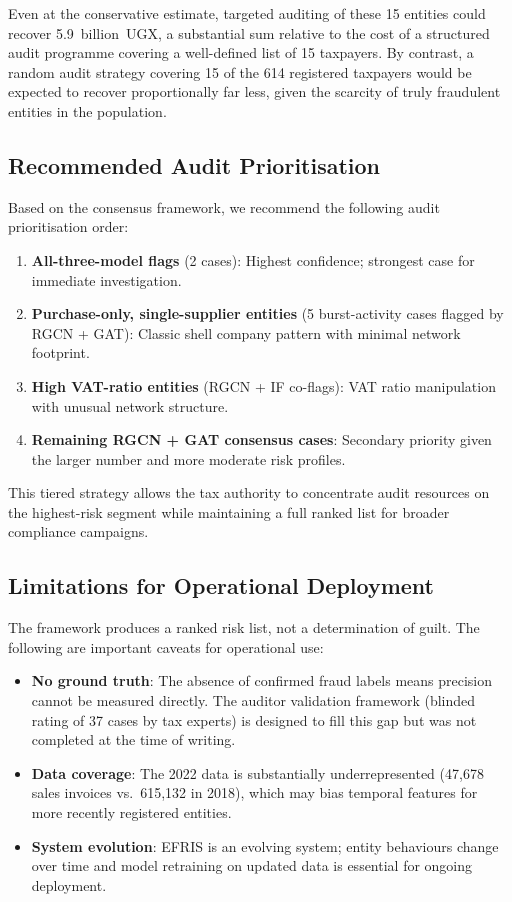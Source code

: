 \documentclass[10pt,twocolumn]{article}
\begin{document}
Even at the conservative estimate, targeted auditing of these 15 entities
could recover 5.9~billion~UGX, a substantial sum relative to the cost of
a structured audit programme covering a well-defined list of 15 taxpayers.
By contrast, a random audit strategy covering 15 of the 614 registered
taxpayers would be expected to recover proportionally far less, given the
scarcity of truly fraudulent entities in the population.

\subsection{Recommended Audit Prioritisation}

Based on the consensus framework, we recommend the following audit
prioritisation order:

\begin{enumerate}
  \item \textbf{All-three-model flags} (2 cases): Highest confidence;
        strongest case for immediate investigation.
  \item \textbf{Purchase-only, single-supplier entities} (5 burst-activity
        cases flagged by RGCN + GAT): Classic shell company pattern with
        minimal network footprint.
  \item \textbf{High VAT-ratio entities} (RGCN + IF co-flags): VAT ratio
        manipulation with unusual network structure.
  \item \textbf{Remaining RGCN + GAT consensus cases}: Secondary priority
        given the larger number and more moderate risk profiles.
\end{enumerate}

This tiered strategy allows the tax authority to concentrate audit resources
on the highest-risk segment while maintaining a full ranked list for broader
compliance campaigns.

\subsection{Limitations for Operational Deployment}

The framework produces a ranked risk list, not a determination of guilt. The
following are important caveats for operational use:

\begin{itemize}
  \item \textbf{No ground truth}: The absence of confirmed fraud labels means
        precision cannot be measured directly. The auditor validation framework
        (blinded rating of 37 cases by tax experts) is designed to fill this gap
        but was not completed at the time of writing.
  \item \textbf{Data coverage}: The 2022 data is substantially underrepresented
        (47,678 sales invoices vs.\ 615,132 in 2018), which may bias temporal
        features for more recently registered entities.
  \item \textbf{System evolution}: EFRIS is an evolving system; entity behaviours
        change over time and model retraining on updated data is essential for
        ongoing deployment.
\end{itemize}
\end{document}
